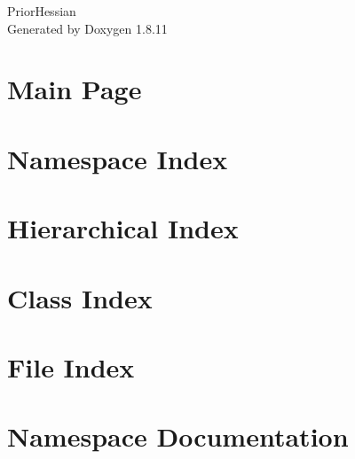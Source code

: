 \documentclass[twoside]{article}
\newcommand{\+}{\discretionary{\mbox{\scriptsize$\hookleftarrow$}}{}{}}
\begin{document}
\hypersetup{pageanchor=false,
             bookmarksnumbered=true,
             pdfencoding=unicode
            }
\begin{titlepage}
\vspace*{7cm}
\begin{center}%
{\Large Prior\+Hessian }\\
\vspace*{1cm}
{\large Generated by Doxygen 1.8.11}\\
\end{center}
\end{titlepage}
\tableofcontents
{}
\hypersetup{pageanchor=true}

\section{Main Page}
\label{index}\hypertarget{index}{}
\section{Namespace Index}

\section{Hierarchical Index}

\section{Class Index}

\section{File Index}

\section{Namespace Documentation}










\end{document}
